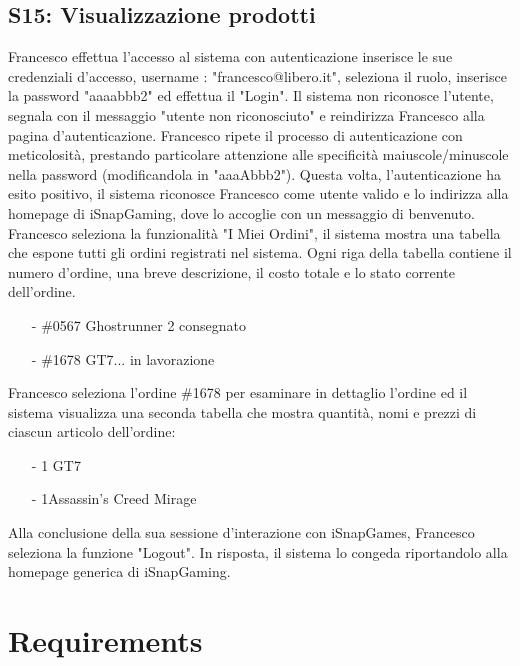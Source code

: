\documentclass[12pt, a4paper, oneside]{book}
\begin{document}
    \subsection*{S15: Visualizzazione prodotti}
        Francesco effettua l'accesso al sistema con autenticazione inserisce  le sue credenziali d'accesso, username :
        "francesco@libero.it", seleziona il ruolo, inserisce la password "aaaabbb2" ed effettua il "Login". Il sistema non
        riconosce l'utente, segnala con il messaggio "utente non riconosciuto" e reindirizza Francesco alla pagina d'autenticazione.
        Francesco ripete il processo di autenticazione con meticolosità, prestando particolare attenzione alle specificità
        maiuscole/minuscole nella password (modificandola in "aaaAbbb2"). Questa volta, l'autenticazione ha esito positivo, il sistema
        riconosce Francesco come utente valido e lo indirizza alla homepage di iSnapGaming, dove lo accoglie con un messaggio di benvenuto.
        Francesco seleziona la funzionalità "I Miei Ordini", il sistema mostra una tabella che espone tutti gli ordini registrati nel sistema.
        Ogni riga della tabella contiene il numero d'ordine, una breve descrizione, il costo totale e lo stato corrente dell'ordine.
            \begin{itemize}
                \item [-] \#0567 Ghostrunner 2 		consegnato
                \item [-] \#1678 GT7... 	in lavorazione
            \end{itemize}
            Francesco seleziona l'ordine \#1678 per esaminare in dettaglio l'ordine ed il  sistema visualizza una seconda tabella
            che mostra quantità, nomi e prezzi di ciascun articolo dell'ordine:
            \begin{itemize}
                \setlength\itemsep{.05cm}
                \item [-] 1	GT7 
                \item [-] 1Assassin's Creed Mirage	
            \end{itemize}
        Alla conclusione della sua sessione d'interazione con iSnapGames, Francesco seleziona la funzione
        "Logout". In risposta, il sistema lo congeda riportandolo alla homepage generica di iSnapGaming.

\section*{Requirements}
\end{document}
